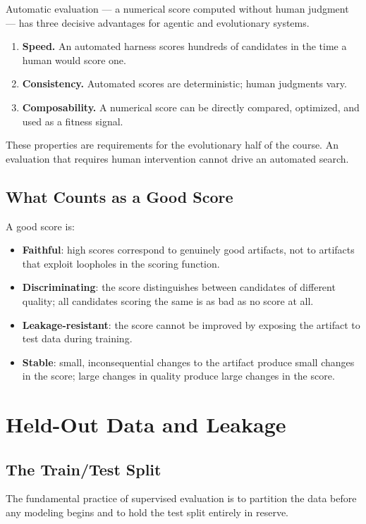 Automatic evaluation — a numerical score computed without human judgment — has three decisive advantages for agentic and evolutionary systems.
\begin{enumerate}
\item \textbf{Speed.} An automated harness scores hundreds of candidates in the time a human would score one.
\item \textbf{Consistency.} Automated scores are deterministic; human judgments vary.
\item \textbf{Composability.} A numerical score can be directly compared, optimized, and used as a fitness signal.
\end{enumerate}
These properties are requirements for the evolutionary half of the course.
An evaluation that requires human intervention cannot drive an automated search.

\subsection{What Counts as a Good Score}

A good score is:
\begin{itemize}
\item \textbf{Faithful}: high scores correspond to genuinely good artifacts, not to artifacts that exploit loopholes in the scoring function.
\item \textbf{Discriminating}: the score distinguishes between candidates of different quality; all candidates scoring the same is as bad as no score at all.
\item \textbf{Leakage-resistant}: the score cannot be improved by exposing the artifact to test data during training.
\item \textbf{Stable}: small, inconsequential changes to the artifact produce small changes in the score; large changes in quality produce large changes in the score.
\end{itemize}

\section{Held-Out Data and Leakage}
\label{section:Leakage}

\subsection{The Train/Test Split}

The fundamental practice of supervised evaluation is to partition the data before any modeling begins and to hold the test split entirely in reserve.

